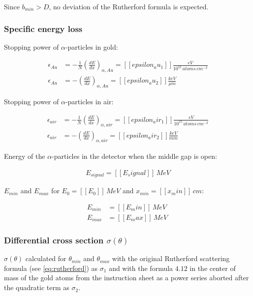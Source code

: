 \documentclass[a4paper]{article}
\begin{document}
Since $b_{min} > D$, no deviation of the Rutherford formula is expected.

\subsubsection{Specific energy loss}
\label{sec:energy_loss}

Stopping power of $\alpha$-particles in gold:

\begin{align}
\epsilon_{Au} &= -\frac{1}{N} \left( \frac{dE}{dx} \right)_{\alpha,Au} = [[epsilon_au_1]] \frac{eV}{10^{15} \, atoms \, cm^{-2}} \\
\epsilon_{Au} &= - \left( \frac{dE}{dx} \right)_{\alpha,Au} = [[epsilon_au_2]] \frac{keV}{\mu m} \ \label{eq:loss_in_air}
\end{align}

Stopping power of $\alpha$-particles in air:

\begin{align}
\epsilon_{air} &= -\frac{1}{N} \left( \frac{dE}{dx} \right)_{\alpha,air} = [[epsilon_air_1]] \frac{eV}{10^{15} \, atoms \, cm^{-2}} \\
\epsilon_{air} &= - \left( \frac{dE}{dx} \right)_{\alpha,air} = [[epsilon_air_2]] \frac{keV}{mm}
\end{align}

Energy of the $\alpha$-particles in the detector when the middle gap is open:

\begin{align}
E_{signal} = [[E_signal]] \, MeV
\end{align}

$E_{min}$ and $E_{max}$ for $E_0 = [[E_0]] \, MeV$ and $x_{min} = [[x_min]] \, cm$:

\begin{align}
E_{min} &= [[E_min]] \, MeV \ \label{eq:e_min} \\
E_{max} &= [[E_max]] \, MeV \ \label{eq:e_max}
\end{align}

\subsubsection{Differential cross section $\sigma(\theta)$}
\label{sec:crosssection}

$\sigma(\theta)$ calculated for $\theta_{min}$ and $\theta_{max}$ with the original Rutherford scattering formula (see \eqref{eq:rutherford}) as $\sigma_1$ and with the formula $4.12$ in the center of mass of the gold atoms from the instruction sheet \cite{inst2007} as a power series aborted after the quadratic term as $\sigma_2$.
\end{document}
